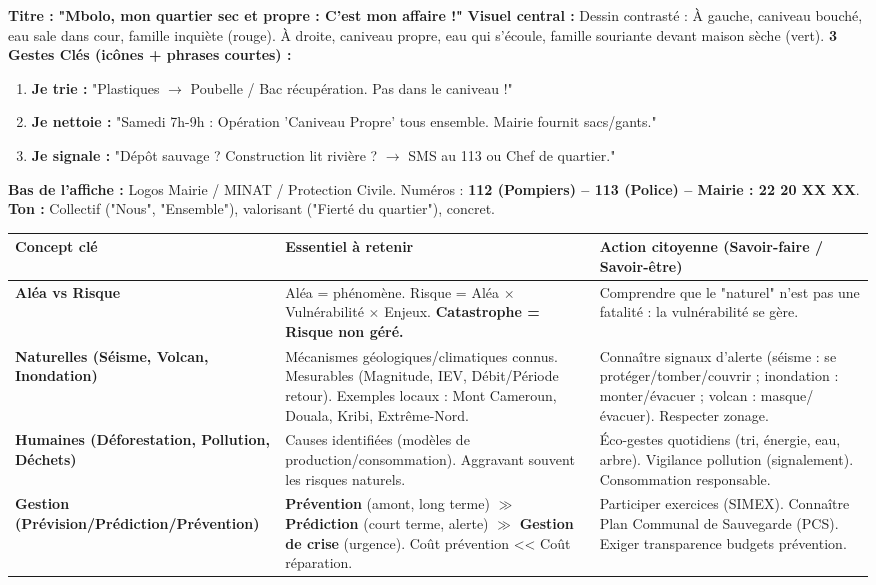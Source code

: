 \documentclass[11pt]{article}
\begin{document}
\begin{corrige}
\textbf{Titre :} \textbf{"Mbolo, mon quartier sec et propre : C'est mon affaire !"}
\textbf{Visuel central :} Dessin contrasté : À gauche, caniveau bouché, eau sale dans cour, famille inquiète (rouge). À droite, caniveau propre, eau qui s'écoule, famille souriante devant maison sèche (vert).
\textbf{3 Gestes Clés (icônes + phrases courtes) :}
\begin{enumerate}
    \item \textbf{Je trie :} "Plastiques $\rightarrow$ Poubelle / Bac récupération. Pas dans le caniveau !"
    \item \textbf{Je nettoie :} "Samedi 7h-9h : Opération 'Caniveau Propre' tous ensemble. Mairie fournit sacs/gants."
    \item \textbf{Je signale :} "Dépôt sauvage ? Construction lit rivière ? $\rightarrow$ SMS au 113 ou Chef de quartier."
\end{enumerate}
\textbf{Bas de l'affiche :} Logos Mairie / MINAT / Protection Civile. Numéros : \textbf{112 (Pompiers) -- 113 (Police) -- Mairie : 22 20 XX XX}.
\textbf{Ton :} Collectif ("Nous", "Ensemble"), valorisant ("Fierté du quartier"), concret.
\end{corrige}

\begin{aretenir}
\begin{center}
\begin{tabularx}{\linewidth}{|l|X|X|}\hline
\textbf{Concept clé} & \textbf{Essentiel à retenir} & \textbf{Action citoyenne (Savoir-faire / Savoir-être)} \\ \hline
\textbf{Aléa vs Risque} & Aléa = phénomène. Risque = Aléa $\times$ Vulnérabilité $\times$ Enjeux. \textbf{Catastrophe = Risque non géré.} & Comprendre que le "naturel" n'est pas une fatalité : la vulnérabilité se gère. \\ \hline
\textbf{Naturelles (Séisme, Volcan, Inondation)} & Mécanismes géologiques/climatiques connus. Mesurables (Magnitude, IEV, Débit/Période retour). Exemples locaux : Mont Cameroun, Douala, Kribi, Extrême-Nord. & Connaître signaux d'alerte (séisme : se protéger/tomber/couvrir ; inondation : monter/évacuer ; volcan : masque/évacuer). Respecter zonage. \\ \hline
\textbf{Humaines (Déforestation, Pollution, Déchets)} & Causes identifiées (modèles de production/consommation). Aggravant souvent les risques naturels. & Éco-gestes quotidiens (tri, énergie, eau, arbre). Vigilance pollution (signalement). Consommation responsable. \\ \hline
\textbf{Gestion (Prévision/Prédiction/Prévention)} & \textbf{Prévention} (amont, long terme) $\gg$ \textbf{Prédiction} (court terme, alerte) $\gg$ \textbf{Gestion de crise} (urgence). Coût prévention << Coût réparation. & Participer exercices (SIMEX). Connaître Plan Communal de Sauvegarde (PCS). Exiger transparence budgets prévention. \\ \hline
\end{tabularx}
\end{center}
\end{aretenir}
\end{document}
